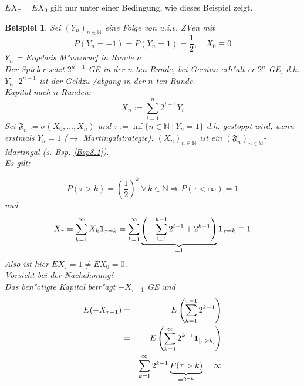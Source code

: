 \documentclass[a4paper,11pt]{scrbook}
\newcommand{\N}{{\mathbb N}}
\newcommand{\ind}{\text{\bf{1}}}
\def\FF{ \mathfrak{F} }
\newtheorem{Bsp}{Beispiel}[chapter]
\theoremstyle{nonumberplain}
\begin{document}
$EX_{\tau} = EX_0$ gilt nur unter einer Bedingung, wie dieses Beispiel zeigt.

\begin{Bsp} \label{Bsp8.6}
Sei $(Y_n)_{n \in \N}$ eine Folge von u.i.v. ZVen mit
\[
P(Y_n = -1) = P(Y_n = 1) = \frac12, \quad X_0 \equiv 0
\]
$Y_n$ = Ergebnis M"unzwurf in Runde $n$.\\
Der Spieler setzt $2^{n-1}$ GE in der $n$-ten Runde, bei Gewinn erh"alt er $2^n$ GE, d.h. $Y_n \cdot 2^{n-1}$ ist der Geldzu-/abgang in der $n$-ten Runde.\\
Kapital nach $n$ Runden:
\[
X_n := \sum_{i=1}^n 2^{i-1}Y_i
\]
Sei $\FF_n := \sigma(X_0,\dots,X_n)$ und $\tau := \inf\{n \in \N\ |\ Y_n = 1\}$ d.h. gestoppt wird, wenn erstmals $Y_n = 1$ ($\rightarrow$ Martingalstrategie). $(X_n)_{n \in \N}$ ist ein $(\FF_n)_{n \in \N}$-Martingal (s. Bsp. \ref{Bsp8.1}).\\
Es gilt:

\[
P(\tau > k) = \left( \frac12 \right)^k \ \forall\, k \in \N \Rightarrow P(\tau < \infty) = 1
\]
und
\[
X_{\tau} = \sum_{k=1}^{\infty} X_k \ind_{\tau = k} = \sum_{k=1}^{\infty} \underbrace{\left( - \sum_{i=1}^{k-1} 2^{i-1} + 2^{k-1} \right)}_{= 1} \ind_{\tau = k} \equiv 1
\]
Also ist hier $EX_{\tau} = 1 \not= EX_0 = 0$.\\
Vorsicht  bei der Nachahmung!\\
Das ben"otigte Kapital betr"agt $-X_{\tau-1}$ GE und
\begin{eqnarray*}
E(-X_{\tau-1}) & = & E \left( \sum_{k=1}^{\tau-1} 2^{k-1} \right) \\
& = & E \left( \sum_{k=1}^{\infty} 2^{k-1} \ind_{[\tau > k]} \right) \\
& = & \sum_{k=1}^{\infty} 2^{k-1} \underbrace{P(\tau > k)}_{= 2^{-k}} = \infty
\end{eqnarray*}
\end{Bsp}
\end{document}
